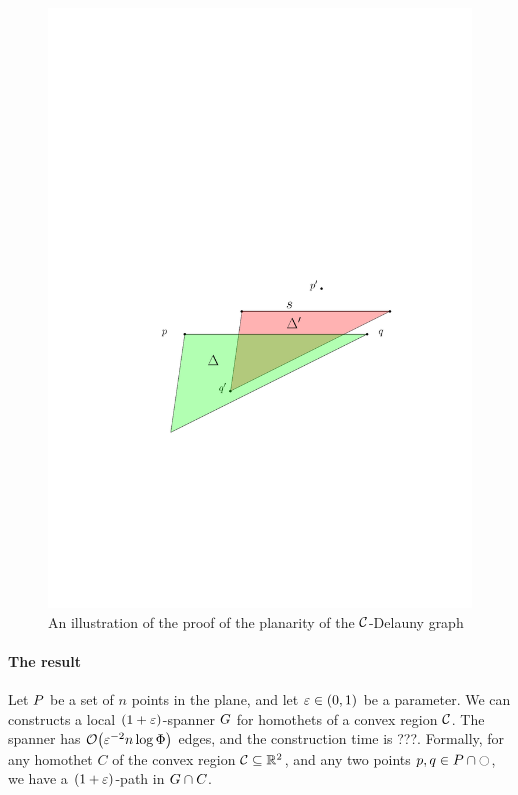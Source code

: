 \documentclass[12pt]{article}%
\begin{document}
\begin{figure}[h]
	\centering%
	\includegraphics[]{figs/planar_DG}%
	\caption{An illustration of the proof of the planarity of the $\mathcal{C}$-Delauny graph }
\end{figure}

\paragraph{The result}
\begin{theorem}
	Let $P$ be a set of $n$ points in the plane, and let
	$\varepsilon \in (0,1)$ be a parameter. We can constructs a
	local $(1+\varepsilon)$-spanner $G$ for homothets of a convex region $\mathcal{C}$. The spanner has $\Of\pth{ \eps^{-2} n\log \spread }$ edges, and the construction time
	is ???.  Formally, for any homothet $C$ of the convex region
	$\mathcal{C}\subseteq \mathbb{R}^2$, and any two points
	$p, q \in P \cap \ocircle$, we have a $(1+\varepsilon)$-path in
	$G \cap {C}$.
\end{theorem}
\end{document}
